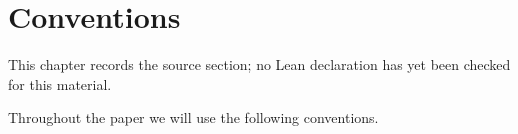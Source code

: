 \chapter{Conventions}
\label{standard-conjectures-abelian-fourfolds-chapter-02}

\begin{remark}
\label{standard-conjectures-abelian-fourfolds-chapter-02-source}
This chapter records the source section; no Lean declaration has yet been checked for this material.
\notready
\end{remark}

Throughout the paper we will use the following conventions.
